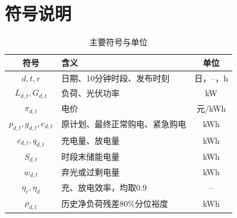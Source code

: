 \section{符号说明}
\begin{table}[H]\centering\caption{主要符号与单位}\label{tab:symbols}
\begin{tabular}{clc}\toprule 符号 & 含义 & 单位\\ \midrule
$d,t,r$ & 日期、10分钟时段、发布时刻 & 日，--，h\\
$L_{d,t},G_{d,t}$ & 负荷、光伏功率 & kW\\
$\pi_{d,t}$ & 电价 & 元/kWh\\
$p_{d,t},g_{d,t},e_{d,t}$ & 原计划、最终正常购电、紧急购电 & kWh\\
$c_{d,t},q_{d,t}$ & 充电量、放电量 & kWh\\
$S_{d,t}$ & 时段末储能电量 & kWh\\
$w_{d,t}$ & 弃光或过剩电量 & kWh\\
$\eta_c,\eta_d$ & 充、放电效率，均取0.9 & --\\
$\rho_{d,t}$ & 历史净负荷残差80\%分位裕度 & kWh\\ \bottomrule
\end{tabular}\end{table}
